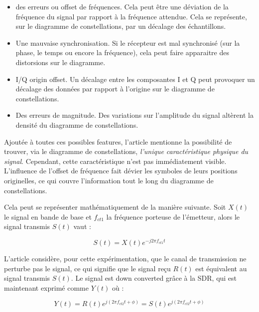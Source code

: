 \begin{itemize}
\item des erreurs ou offset de fréquences. Cela peut être une déviation de la fréquence du signal par rapport à la fréquence attendue. Cela se représente, sur le diagramme de constellations, par un décalage des échantillons. 
\item Une mauvaise synchronisation. Si le récepteur est mal synchronisé (sur la phase, le temps ou encore la fréquence), cela peut faire apparaitre des distorsions sur le diagramme.
\item \ac{I/Q} origin offset. Un décalage entre les composantes I et Q peut provoquer un décalage des données par rapport à l'origine sur le diagramme de constellations.
\item Des erreurs de magnitude. Des variations sur l'amplitude du signal altèrent la densité du diagramme de constellations.
\end{itemize}

\vspace{0.1cm}

Ajoutée à toutes ces possibles features, l'article mentionne la possibilité de trouver, via le diagramme de constellations, \textit{l'unique caractéristique physique du signal}. Cependant, cette caractéristique n'est pas immédiatement visible. L'influence de l'offset de fréquence fait dévier les symboles de leurs positions originelles, ce qui couvre l'information tout le long du diagramme de constellations.

\vspace{0.1cm}

Cela peut se représenter mathématiquement de la manière suivante. Soit $X(t)$ le signal en bande de base et $f_{ct1}$ la fréquence porteuse de l'émetteur, alors le signal transmis $S(t)$ vaut :

\begin{equation}\label{eq4000}
	S(t) = X(t) e^{-j2\pi f_{ct1} t}
\end{equation} 

L'article considère, pour cette expérimentation, que le canal de transmission ne perturbe pas le signal, ce qui signifie que le signal reçu $R(t)$ est équivalent au signal transmis $S(t)$. Le signal est down converted grâce à la \ac{SDR}, qui est maintenant exprimé comme $Y(t)$ où :

\begin{equation}\label{eq4001}
	Y(t) = R(t) e^{j(2\pi f_{ct2} t + \phi)} = S(t) e^{j(2\pi f_{ct2} t + \phi)}
\end{equation} 

